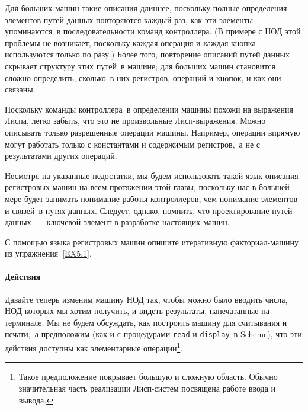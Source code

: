 \begin{plainlist}


\item
Для больших машин такие описания длиннее, поскольку
полные определения элементов путей данных повторяются каждый раз, как
эти элементы упоминаются~в последовательности команд контроллера. (В
примере с НОД этой проблемы не возникает, поскольку каждая операция и
каждая кнопка используются только по разу.)  Более того, повторение описаний
путей данных скрывает структуру этих путей~в машине; для больших машин
становится сложно определить, сколько~в них регистров, операций и кнопок, и как
они связаны.

\item
Поскольку команды контроллера~в определении машины
похожи на выражения Лиспа, легко забыть, что это не произвольные
Лисп-выражения.  Можно описывать только разрешенные операции машины.
Например, операции впрямую могут работать только с константами и
содержимым регистров,~а не с результатами других операций.
\end{plainlist}
Несмотря на указанные недостатки, мы будем использовать такой язык описания
регистровых машин на всем протяжении этой главы, поскольку нас в
большей мере будет занимать понимание работы контроллеров, чем
понимание элементов и связей~в путях данных.  Следует, однако,
помнить, что проектирование путей данных~--- ключевой элемент в
разработке настоящих машин.
\begin{exercise}{5.2}%
\label{EX5.2}%
С помощью языка регистровых машин опишите итеративную
факториал-машину из упражнения~\ref{EX5.1}.
\sloppy
\end{exercise}

\paragraph{Действия}

Давайте теперь изменим машину НОД так, чтобы можно было
вводить числа, НОД которых мы хотим получить, и видеть результаты,
напечатанные на терминале.  Мы не будем обсуждать, как построить
машину для считывания и печати,~а предположим (как и с процедурами
{\tt read} и {\tt display}~в Scheme), что эти действия
доступны как элементарные операции\footnote{Такое предположение покрывает большую и сложную
область.  Обычно значительная часть реализации Лисп-систем посвящена
работе ввода и вывода.
}.

